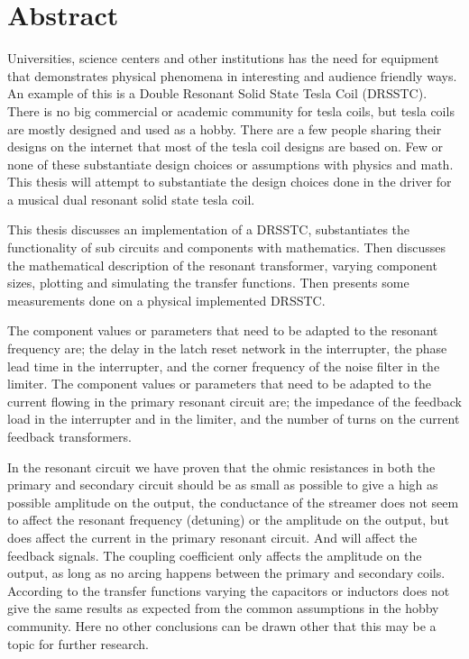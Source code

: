 \section*{Abstract}
Universities, science centers and other institutions has the need for equipment that demonstrates physical phenomena in interesting and audience friendly ways. An example of this is a Double Resonant Solid State Tesla Coil (DRSSTC). There is no big commercial or academic community for tesla coils, but tesla coils are mostly designed and used as a hobby. There are a few people sharing their designs on the internet that most of the tesla coil designs are based on. Few or none of these substantiate design choices or assumptions with physics and math. This thesis will attempt to substantiate the design choices done in the driver for a musical dual resonant solid state tesla coil.

This thesis discusses an implementation of a DRSSTC, substantiates the functionality of sub circuits and components with mathematics. Then discusses the mathematical description of the resonant transformer, varying component sizes, plotting and simulating the transfer functions. Then presents some measurements done on a physical implemented DRSSTC.

The component values or parameters that need to be adapted to the resonant frequency are; the delay in the latch reset network in the interrupter, the phase lead time in the interrupter, and the corner frequency of the noise filter in the limiter. The component values or parameters that need to be adapted to the current flowing in the primary resonant circuit are; the impedance of the feedback load in the interrupter and in the limiter, and the number of turns on the current feedback transformers.

In the resonant circuit we have proven that the ohmic resistances in both the primary and secondary circuit should be as small as possible to give a high as possible amplitude on the output, the conductance of the streamer does not seem to affect the resonant frequency (detuning) or the amplitude on the output, but does affect the current in the primary resonant circuit. And will affect the feedback signals. The coupling coefficient only affects the amplitude on the output, as long as no arcing happens between the primary and secondary coils. According to the transfer functions varying the capacitors or inductors does not give the same results as expected from the common assumptions in the hobby community. Here no other conclusions can be drawn other that this may be a topic for further research.
